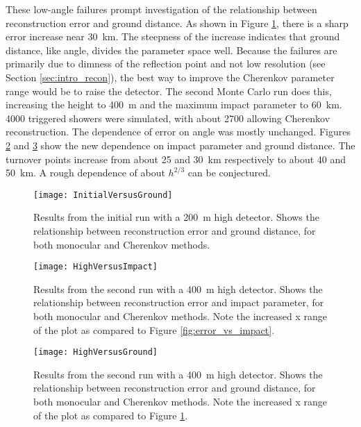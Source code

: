 These low-angle failures prompt investigation of the relationship between reconstruction error and ground distance. As shown in Figure \ref{fig:error_vs_gnd}, there is a sharp error increase near \SI{30}{km}. The steepness of the increase indicates that ground distance, like angle, divides the parameter space well. Because the failures are primarily due to dimness of the reflection point and not low resolution (see Section \ref{sec:intro_recon}), the best way to improve the Cherenkov parameter range would be to raise the detector. The second Monte Carlo run does this, increasing the height to \SI{400}{m} and the maximum impact parameter to \SI{60}{km}. \num{4000} triggered showers were simulated, with about \num{2700} allowing Cherenkov reconstruction. The dependence of error on angle was mostly unchanged. Figures \ref{fig:raised_impact} and \ref{fig:raised_gnd} show the new dependence on impact parameter and ground distance. The turnover points increase from about \num{25} and \SI{30}{km} respectively to about \num{40} and \SI{50}{km}. A rough dependence of about $h^{2/3}$ can be conjectured.

\begin{figure}[p]
    \label{fig:error_vs_gnd}
    \centering
    \texttt{[image: InitialVersusGround]}
    \caption{Results from the initial run with a \SI{200}{m} high detector. Shows the relationship between reconstruction error and ground distance, for both monocular and Cherenkov methods.}
\end{figure}

\begin{figure}[p]
    \label{fig:raised_impact}
    \centering
    \texttt{[image: HighVersusImpact]}
    \caption{Results from the second run with a \SI{400}{m} high detector. Shows the relationship between reconstruction error and impact parameter, for both monocular and Cherenkov methods. Note the increased x range of the plot as compared to Figure \ref{fig:error_vs_impact}.}
\end{figure}

\begin{figure}[p]
    \label{fig:raised_gnd}
    \centering
    \texttt{[image: HighVersusGround]}
    \caption{Results from the second run with a \SI{400}{m} high detector. Shows the relationship between reconstruction error and ground distance, for both monocular and Cherenkov methods. Note the increased x range of the plot as compared to Figure \ref{fig:error_vs_gnd}.}
\end{figure}

